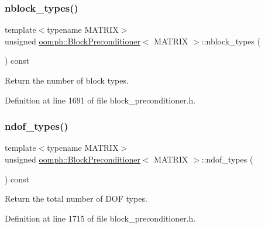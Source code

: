 \subsubsection{\texorpdfstring{nblock\+\_\+types()}{nblock\_types()}}
{\footnotesize\ttfamily template$<$typename M\+A\+T\+R\+IX$>$ \\
unsigned \hyperlink{classoomph_1_1BlockPreconditioner}{oomph\+::\+Block\+Preconditioner}$<$ M\+A\+T\+R\+IX $>$\+::nblock\+\_\+types (\begin{DoxyParamCaption}{ }\end{DoxyParamCaption}) const\hspace{0.3cm}{\ttfamily [inline]}}



Return the number of block types. 



Definition at line 1691 of file block\+\_\+preconditioner.\+h.

\mbox{\label{classoomph_1_1BlockPreconditioner_ab6cca480686ea8e44244ac60a0db23ba}} 
\subsubsection{\texorpdfstring{ndof\+\_\+types()}{ndof\_types()}}
{\footnotesize\ttfamily template$<$typename M\+A\+T\+R\+IX$>$ \\
unsigned \hyperlink{classoomph_1_1BlockPreconditioner}{oomph\+::\+Block\+Preconditioner}$<$ M\+A\+T\+R\+IX $>$\+::ndof\+\_\+types (\begin{DoxyParamCaption}{ }\end{DoxyParamCaption}) const\hspace{0.3cm}{\ttfamily [inline]}}



Return the total number of D\+OF types. 



Definition at line 1715 of file block\+\_\+preconditioner.\+h.

\mbox{\label{classoomph_1_1BlockPreconditioner_a45509677ccef78be13b5e4485312ddc1}} 
